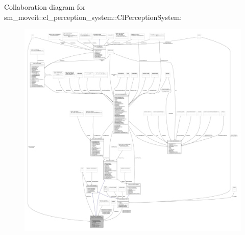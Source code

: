 Collaboration diagram for sm\+\_\+moveit\+:\+:cl\+\_\+perception\+\_\+system\+:\+:Cl\+Perception\+System\+:
\nopagebreak
\begin{figure}[H]
\begin{center}
\leavevmode
\includegraphics[width=350pt]{classsm__moveit_1_1cl__perception__system_1_1ClPerceptionSystem__coll__graph}
\end{center}
\end{figure}
